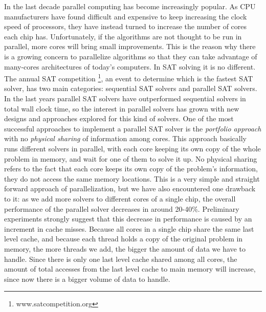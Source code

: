 \documentclass[12pt]{diicc}
\begin{document}
In the last decade parallel computing has become increasingly popular. As CPU manufacturers have found difficult and expensive to keep increasing the clock speed of processors, they have instead turned to increase the number of cores each chip has. Unfortunately, if the algorithms are not thought to be run in parallel, more cores will bring small improvements. This is the reason why there is a growing concern to parallelize algorithms so that they can take advantage of many-cores architectures of today's computers. In SAT solving it is no different. The annual SAT competition \footnote[1]{www.satcompetition.org}, an event to determine which is the fastest SAT solver, has two main categories: sequential SAT solvers and parallel SAT solvers. In the last years parallel SAT solvers have outperformed sequential solvers in total wall clock time, so the interest in parallel solvers has grown with new designs and approaches explored for this kind of solvers. One of the most successful approaches to implement a parallel SAT solver is the \textit{portfolio approach} with no \textit{physical sharing} of information among cores. This approach basically runs different solvers in parallel, with each core keeping its own copy of the whole problem in memory, and wait for one of them to solve it up. No physical sharing refers to the fact that each core keeps its own copy of the problem's information, they do not access the same memory locations. This is a very simple and straight forward approach of parallelization, but we have also encountered one drawback to it: as we add more solvers to different cores of a single chip, the overall performance of the parallel solver decreases in around 20-40\%. Preliminary experiments strongly suggest that this decrease in performance is caused by an increment in cache misses. Because all cores in a single chip share the same last level cache, and because each thread holds a copy of the original problem in memory, the more threads we add, the bigger the amount of data we have to handle. Since there is only one last level cache shared among all cores, the amount of total accesses from the last level cache to main memory will increase, since now there is a bigger volume of data to handle. 
\end{document}
